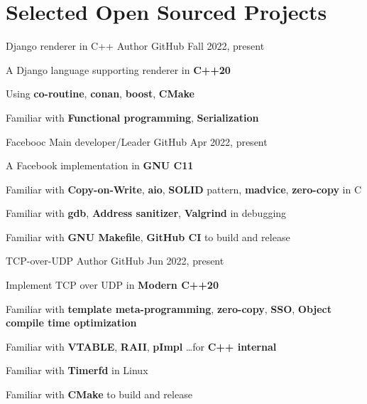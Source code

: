 \section*{Selected Open Sourced Projects}
\vspace*{-17pt}
\begin{multicols}{2}
\def\customTextWidth{0.45\textwidth}
\cventry
{Django renderer in C++}
{Author}
{GitHub} %
{Fall 2022, present} %
{
    \vspace{5pt}
    \begin{cvitem} %
    \item {A Django language supporting renderer in \textbf{C++20}}
    \item {Using \textbf{co-routine}, \textbf{conan}, \textbf{boost}, \textbf{CMake}}
    \item {Familiar with \textbf{Functional programming}, \textbf{Serialization}}
    \end{cvitem}
}

\cventry
{Facebooc}
{Main developer/Leader}
{GitHub} %
{Apr 2022, present} %
{
    \vspace{5pt}
    \begin{cvitem} %
        \item {A Facebook implementation in \textbf{GNU C11}}
        \item {Familiar with \textbf{Copy-on-Write}, \textbf{aio}, \textbf{SOLID} pattern, \textbf{madvice}, \textbf{zero-copy} in C}
        \item {Familiar with \textbf{gdb}, \textbf{Address sanitizer}, \textbf{Valgrind} in debugging}
        \item {Familiar with \textbf{GNU Makefile}, \textbf{GitHub CI} to build and release}
    \end{cvitem}
}

\cventry
{TCP-over-UDP}
{Author}
{GitHub} %
{Jun 2022, present} %
{
    \vspace{5pt}
    \begin{cvitem} %
        \item {Implement TCP over UDP in \textbf{Modern C++20}}
        \item {Familiar with \textbf{template meta-programming}, \textbf{zero-copy}, \textbf{SSO}, \textbf{Object compile time optimization}}
        \item {Familiar with \textbf{VTABLE}, \textbf{RAII}, \textbf{pImpl} \dots for \textbf{C++ internal}}
        \item Familiar with \textbf{Timerfd} in Linux
        \item Familiar with \textbf{CMake} to build and release
    \end{cvitem}
}


\end{multicols}

